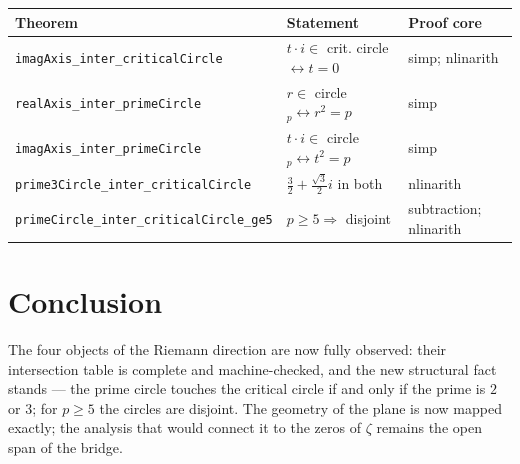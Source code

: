 \documentclass[sigplan,10pt,anonymous,review]{acmart}
\begin{document}
\begin{center}
\begin{tabular}{lll}
\toprule
Theorem & Statement & Proof core \\
\midrule
\texttt{imagAxis\_inter\_criticalCircle} & $t \cdot i \in$ crit. circle $\leftrightarrow t = 0$ & simp; nlinarith \\
\texttt{realAxis\_inter\_primeCircle} & $r \in$ circle$_p \leftrightarrow r^2 = p$ & simp \\
\texttt{imagAxis\_inter\_primeCircle} & $t \cdot i \in$ circle$_p \leftrightarrow t^2 = p$ & simp \\
\texttt{prime3Circle\_inter\_criticalCircle} & $\frac32 + \frac{\sqrt3}{2}i$ in both & nlinarith \\
\texttt{primeCircle\_inter\_criticalCircle\_ge5} & $p \ge 5 \Rightarrow$ disjoint & subtraction; nlinarith \\
\bottomrule
\end{tabular}
\end{center}

\section{Conclusion}

The four objects of the Riemann direction are now fully observed: their
intersection table is complete and machine-checked, and the new
structural fact stands --- the prime circle touches the critical circle
if and only if the prime is $2$ or $3$; for $p \ge 5$ the circles are
disjoint. The geometry of the plane is now mapped exactly; the analysis
that would connect it to the zeros of $\zeta$ remains the open span of
the bridge.



\end{document}
